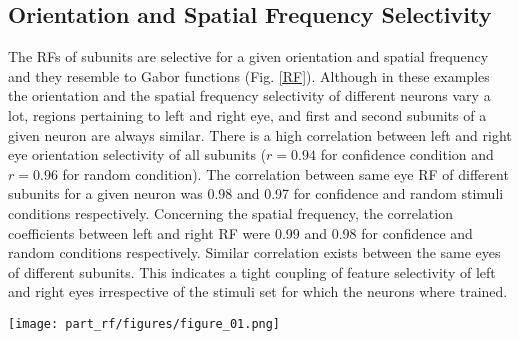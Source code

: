 {\subsection{{Orientation and Spatial Frequency Selectivity}}
 
The RFs of subunits are selective for a given orientation and spatial
frequency and they resemble to Gabor functions (Fig. \ref{RF}). Although in
these examples the orientation and the spatial frequency selectivity of
different neurons vary a lot, regions pertaining to left and right eye, and
first and second subunits of a given neuron are always similar. There is a
high correlation between left and right eye orientation selectivity of all
subunits ($ r = 0.94$ for confidence condition and $r = 0.96$ for random
condition). The correlation between same eye RF of different subunits for a
given neuron was 0.98 and 0.97 for confidence and random stimuli conditions
respectively. Concerning the spatial frequency, the correlation
coefficients between left and right RF were 0.99 and 0.98 for confidence
and random conditions respectively. Similar correlation exists between the
same eyes of different subunits. This indicates a tight coupling of
feature selectivity of left and right eyes irrespective of the stimuli set
for which the neurons where trained. 

\begin{SCfigure}[50][!htb]
\texttt{[image: part\_rf/figures/figure\_01.png]}
\caption[A Selection of RFs Representing Optimally Stable Representations
of Stereoscopic Natural Movies.]{\textbf{A Selection of RFs Representing
Optimally Stable Representations of Stereoscopic Natural Movies.} The
binocular RFs of 6 neurons are presented in each row. Each cells is given
an index number to specify its location in the next Fig.. Receptive fields
of subunits are selective for a given orientation and spatial frequency. A
given pair of subunits as well as different eyes of a given subunit exhibit
similar preferences. Left and right RFs of subunits of \textit{Cell 1}
encode disparities with a shift in the phase of their monocular RFs. On the
other side, the \textit{cell 3} encode disparities by positional shifts of
the RFs. \textit{Cells 2}, \textit{4} and \textit{6} are binocularly
unbalanced. These occur mostly when the cells are trained with less
correlated binocular input (\textit{random} condition). Another point worth
to mention is that cells seems to be selective for horizontal disparities
independent of the orientation selectivity of the cell (see \textit{cell 3}
and \textit{6}).} \label{RF} \end{SCfigure} 

}
